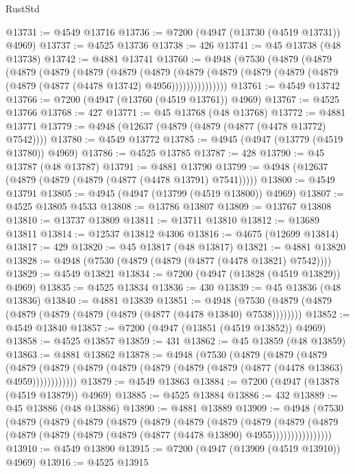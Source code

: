 \begin{lexlean}{RustStd}
\begin{coremodule}
@13731 := @4549 @13716
@13736 := @7200 (@4947 (@13730 (@4519 @13731)) @4969)
@13737 := @4525 @13736
@13738 := 426
@13741 := @45 @13738 (@48 @13738)
@13742 := @4881 @13741
@13760 := @4948
    (@7530
      (@4879
        (@4879
          (@4879
            (@4879
              (@4879
                (@4879
                  (@4879
                    (@4879
                      (@4879 (@4879 (@4879 (@4879 (@4879 (@4877 (@4478 @13742) @4956)))))))))))))))
@13761 := @4549 @13742
@13766 := @7200 (@4947 (@13760 (@4519 @13761)) @4969)
@13767 := @4525 @13766
@13768 := 427
@13771 := @45 @13768 (@48 @13768)
@13772 := @4881 @13771
@13779 := @4948 (@12637 (@4879 (@4879 (@4877 (@4478 @13772) @7542))))
@13780 := @4549 @13772
@13785 := @4945 (@4947 (@13779 (@4519 @13780)) @4969)
@13786 := @4525 @13785
@13787 := 428
@13790 := @45 @13787 (@48 @13787)
@13791 := @4881 @13790
@13799 := @4948 (@12637 (@4879 (@4879 (@4879 (@4877 (@4478 @13791) @7541)))))
@13800 := @4549 @13791
@13805 := @4945 (@4947 (@13799 (@4519 @13800)) @4969)
@13807 := @4525 @13805 @4533
@13808 := @13786 @13807
@13809 := @13767 @13808
@13810 := @13737 @13809
@13811 := @13711 @13810
@13812 := @13689 @13811
@13814 := @12537 @13812 @4306
@13816 := @4675 (@12699 @13814)
@13817 := 429
@13820 := @45 @13817 (@48 @13817)
@13821 := @4881 @13820
@13828 := @4948 (@7530 (@4879 (@4879 (@4877 (@4478 @13821) @7542))))
@13829 := @4549 @13821
@13834 := @7200 (@4947 (@13828 (@4519 @13829)) @4969)
@13835 := @4525 @13834
@13836 := 430
@13839 := @45 @13836 (@48 @13836)
@13840 := @4881 @13839
@13851 := @4948 (@7530 (@4879 (@4879 (@4879 (@4879 (@4879 (@4879 (@4877 (@4478 @13840) @7538))))))))
@13852 := @4549 @13840
@13857 := @7200 (@4947 (@13851 (@4519 @13852)) @4969)
@13858 := @4525 @13857
@13859 := 431
@13862 := @45 @13859 (@48 @13859)
@13863 := @4881 @13862
@13878 := @4948
    (@7530
      (@4879
        (@4879
          (@4879
            (@4879 (@4879 (@4879 (@4879 (@4879 (@4879 (@4879 (@4877 (@4478 @13863) @4959))))))))))))
@13879 := @4549 @13863
@13884 := @7200 (@4947 (@13878 (@4519 @13879)) @4969)
@13885 := @4525 @13884
@13886 := 432
@13889 := @45 @13886 (@48 @13886)
@13890 := @4881 @13889
@13909 := @4948
    (@7530
      (@4879
        (@4879
          (@4879
            (@4879
              (@4879
                (@4879
                  (@4879
                    (@4879
                      (@4879
                        (@4879
                          (@4879 (@4879 (@4879 (@4879 (@4877 (@4478 @13890) @4955))))))))))))))))
@13910 := @4549 @13890
@13915 := @7200 (@4947 (@13909 (@4519 @13910)) @4969)
@13916 := @4525 @13915

\end{coremodule}
\end{lexlean}
